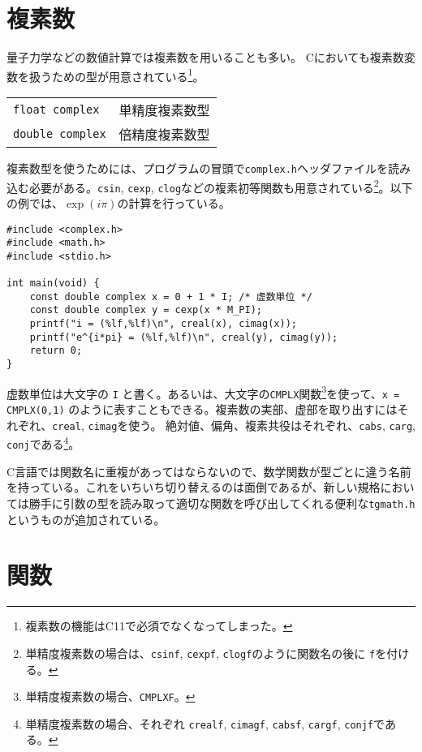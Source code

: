 \section{複素数}
\label{sec:C:complex}
量子力学などの数値計算では複素数を用いることも多い。
Cにおいても複素数変数を扱うための型が用意されている\footnote{複素数の機能はC11で必須でなくなってしまった。}。
\begin{table}[H]
    \centering
    \begin{tabular}{ll}
        \texttt{float complex}  & 単精度複素数型 \\
        \texttt{double complex} & 倍精度複素数型
    \end{tabular}
\end{table} \noindent
複素数型を使うためには、プログラムの冒頭で\texttt{complex.h}ヘッダファイルを読み込む必要がある。\texttt{csin}, \texttt{cexp}, \texttt{clog}などの複素初等関数も用意されている\footnote{単精度複素数の場合は、\texttt{csinf}, \texttt{cexpf}, \texttt{clogf}のように関数名の後に \texttt{f}を付ける。}。以下の例では、\(\exp(i\pi)\)の計算を行っている。
\begin{reidai}\label{ex:complex}
    \begin{verbatim}
#include <complex.h>
#include <math.h>
#include <stdio.h>

int main(void) {
    const double complex x = 0 + 1 * I; /* 虚数単位 */
    const double complex y = cexp(x * M_PI);
    printf("i = (%lf,%lf)\n", creal(x), cimag(x));
    printf("e^{i*pi} = (%lf,%lf)\n", creal(y), cimag(y));
    return 0;
}
\end{verbatim}
\end{reidai} \noindent
虚数単位は大文字の \texttt{I} と書く。あるいは、大文字の\texttt{CMPLX}関数\footnote{単精度複素数の場合、\texttt{CMPLXF}。}を使って、\texttt{x = CMPLX(0,1)} のように表すこともできる。複素数の実部、虚部を取り出すにはそれぞれ、\texttt{creal}, \texttt{cimag}を使う。
絶対値、偏角、複素共役はそれぞれ、\texttt{cabs}, \texttt{carg}, \texttt{conj}である\footnote{単精度複素数の場合、それぞれ \texttt{crealf}, \texttt{cimagf}, \texttt{cabsf}, \texttt{cargf}, \texttt{conjf}である。}。

C言語では関数名に重複があってはならないので、数学関数が型ごとに違う名前を持っている。これをいちいち切り替えるのは面倒であるが、新しい規格においては勝手に引数の型を読み取って適切な関数を呼び出してくれる便利な\texttt{tgmath.h}というものが追加されている。

\section{関数}
\label{sec:C:function}

